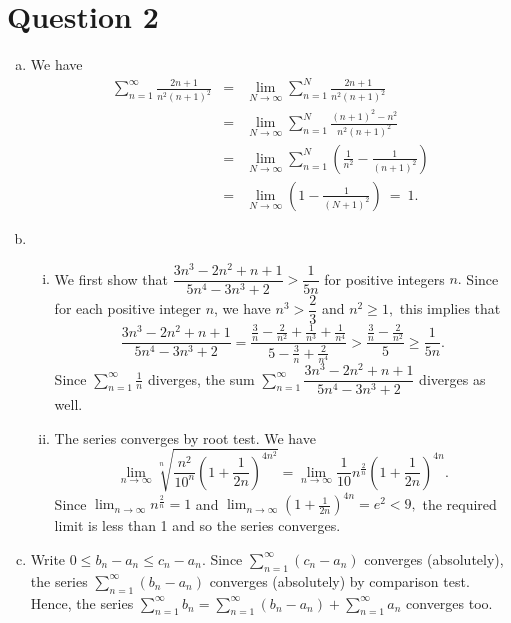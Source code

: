 \documentclass{article}
\begin{document}
\section*{Question 2}
\begin{enumerate}[(a)]
    \item We have 
    \begin{eqnarray*}
    \sum_{n=1}^{\infty}\frac{2n+1}{n^2(n+1)^2}&=&\lim_{N\to\infty}\sum_{n=1}^{N}\frac{2n+1}{n^2(n+1)^2}\\
    &=&\lim_{N\to\infty}\sum_{n=1}^{N}\frac{(n+1)^2-n^2}{n^2(n+1)^2}\\
    &=&\lim_{N\to\infty}\sum_{n=1}^{N}\left(\frac{1}{n^2}-\frac{1}{(n+1)^2}\right)\\
    &=&\lim_{N\to\infty}\left(1-\frac{1}{(N+1)^2}\right)\ =\ 1.
    \end{eqnarray*}
    \item \begin{enumerate}[(i)]
        \item We first show that $\dfrac{3n^3-2n^2+n+1}{5n^4-3n^3+2}>\dfrac{1}{5n}$ for positive integers $n.$ 
        Since for each positive integer $n$, we have $n^3>\dfrac{2}{3}$ and $n^2\geq 1,$ this implies that $$
        \frac{3n^3-2n^2+n+1}{5n^4-3n^3+2}=\frac{\frac{3}{n}-\frac{2}{n^2}+\frac{1}{n^3}+\frac{1}{n^4}}{5-\frac{3}{n}+\frac{2}{n^4}}
        >\frac{\frac{3}{n}-\frac{2}{n^2}}{5}
        \geq\frac{1}{5n}.
        $$
        Since $\displaystyle\sum^{\infty}_{n=1}\frac{1}{n}$ diverges, the sum $\displaystyle\sum^{\infty}_{n=1}\dfrac{3n^3-2n^2+n+1}{5n^4-3n^3+2}$ diverges as well.
        \item The series converges by root test. We have $$\lim_{n\to\infty}\sqrt[n]{\frac{n^2}{10^n}\left(1+\frac{1}{2n}\right)^{4n^2}}=\lim_{n\to\infty}\frac{1}{10}n^{\frac{2}{n}}\left(1+\frac{1}{2n}\right)^{4n}.$$
        Since $\displaystyle\lim_{n\to\infty}n^{\frac{2}{n}}=1$ and $\displaystyle\lim_{n\to\infty}\left(1+\frac{1}{2n}\right)^{4n}=e^2<9,$ the required limit is less than 1 and so the series converges.
    \end{enumerate}
    \item Write $0\leq b_n-a_n\leq c_n-a_n.$ Since $\displaystyle\sum^{\infty}_{n=1}(c_n-a_n)$ converges (absolutely), the series $\displaystyle\sum^{\infty}_{n=1}(b_n-a_n)$ converges (absolutely) by comparison test. Hence, the series $\displaystyle\sum^{\infty}_{n=1}b_n=\displaystyle\sum^{\infty}_{n=1}(b_n-a_n)+\displaystyle\sum^{\infty}_{n=1}a_n$ converges too.
\end{enumerate}
\end{document}
